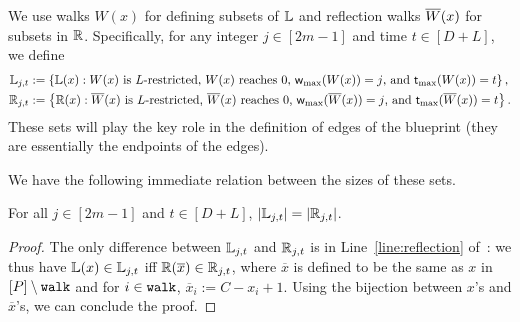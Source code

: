 


We use walks $W(x)$ for defining subsets of $\mathbb{L}$ and reflection walks $\overline{W}(x)$ for subsets in $\mathbb{R}$. Specifically, for any integer $j \in [2m-1]$ and time $t \in [D+L]$, we define
\begin{align*}
	\mathbb{L}_{j,t} &:= \left\{ \mathbb{L}(x) : \text{$W(x)$ is $L$-restricted, $W(x)$ reaches $0$, $\textnormal{\textsf{w}}_{\textnormal{max}}(W(x))=j$, and $\textnormal{\textsf{t}}_{\textnormal{max}}(W(x)) = t$} \right\}, \\
	\mathbb{R}_{j,t} &:= \left\{ \mathbb{R}(x) : \text{$\overline{W}(x)$ is $L$-restricted, $\overline{W}(x)$ reaches $0$, $\textnormal{\textsf{w}}_{\textnormal{max}}(\overline{W}(x))=j$, and $\textnormal{\textsf{t}}_{\textnormal{max}}(\overline{W}(x)) = t$} \right\}. 
\end{align*}
These sets will play the key role in the definition of edges of the blueprint (they are essentially the endpoints of the edges). 

We have the following immediate relation between the sizes of these sets. 

\begin{claim}\label{obs:bjt-direct}
	For all $j \in [2m-1]$ and $t \in [D+L]$, $\left\vert{\mathbb{L}_{j,t}}\right\vert = \left\vert{\mathbb{R}_{j,t}}\right\vert$.
\end{claim}
\begin{proof}
	The only difference between $\mathbb{L}_{j,t}$ and $\mathbb{R}_{j,t}$ is in Line~\eqref{line:reflection} of~: we thus have $\mathbb{L}(x) \in \mathbb{L}_{j,t}$ iff $\mathbb{R}(\overline{x}) \in \mathbb{R}_{j,t}$, where
	$\overline{x}$ is defined to be the same as $x$ in $[P] \setminus \textnormal{\texttt{walk}}$ and for $i \in \textnormal{\texttt{walk}}$, $\overline{x}_i := C - x_i + 1$. Using the bijection between $x$'s and $\overline{x}$'s, we can conclude the proof. 
\end{proof}

